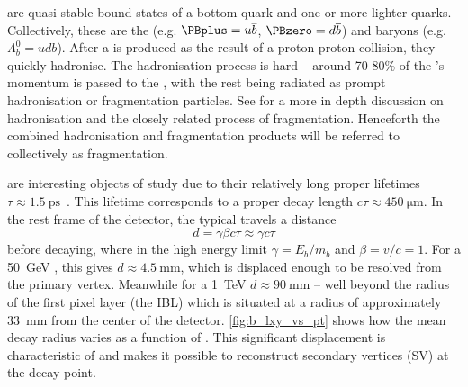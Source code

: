 \bhadrons are quasi-stable bound states of a bottom quark and one or more lighter quarks.
Collectively, these are the \bmesons (e.g. $\PBplus = u \overline{b}$, $\PBzero = d \overline{b}$) and baryons (e.g. $\Lambda_b^0 = udb$).
After a \bquark is produced as the result of a proton-proton collision, they quickly hadronise.
The hadronisation process is hard -- around 70-80\% of the \bquark's momentum is passed to the \bhadron, with the rest being radiated as prompt hadronisation or fragmentation particles.
See  for a more in depth discussion on hadronisation and the closely related process of fragmentation.
Henceforth the combined hadronisation and fragmentation products will be referred to collectively as fragmentation.

\bhadrons are interesting objects of study due to their relatively long proper lifetimes $\tau \approx \SI{1.5}{\pico\second}$~\cite{PhysRevD.98.030001}.
This lifetime corresponds to a proper decay length $c \tau \approx \SI{450}{\micro\meter}$.
In the rest frame of the detector, the typical \bhadron travels a distance 
%
\begin{equation}
  d = \gamma \beta c \tau \approx \gamma c \tau
\end{equation}
%
before decaying, where in the high energy limit $\gamma = E_b/m_b$ and $\beta = v/c = 1$.
For a \SI{50}{\GeV} \bhadron, this gives $d \approx \SI{4.5}{\milli\meter}$, which is displaced enough to be resolved from the primary vertex.
Meanwhile for a \SI{1}{\TeV} \bhadron $d \approx \SI{90}{\milli\meter}$ -- well beyond the radius of the first pixel layer (the IBL) which is situated at a radius of approximately \SI{33}{\milli\meter} from the center of the detector.
\cref{fig:b_lxy_vs_pt} shows how the mean decay radius varies as a function of \bhadron \pt.
This significant displacement is characteristic of \bjets and makes it possible to reconstruct secondary vertices (SV) at the \bhadron decay point.

